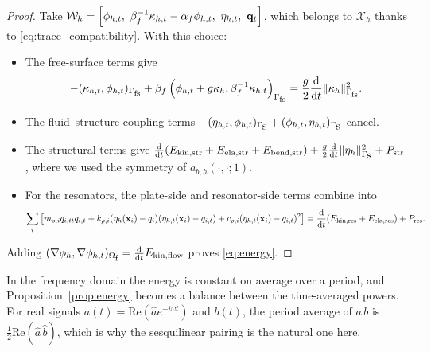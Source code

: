 \begin{proof}
Take $\mathcal{W}_h=\left[\phi_{h,t},\ \beta_f^{-1}\kappa_{h,t}-\alpha_f\phi_{h,t},\ \eta_{h,t},\ \qvec_t\right]$, which belongs to $\mathcal{X}_h$ thanks to \eqref{eq:trace_compatibility}. With this choice:
\begin{itemize}
    \item The free-surface terms give
    \begin{equation*}
        -(\kappa_{h,t},\phi_{h,t})_{\Gamma_{\mbox{\scriptsize fs}}}+\beta_f\left(\phi_{h,t}+g\kappa_h,\beta_f^{-1}\kappa_{h,t}\right)_{\Gamma_{\mbox{\scriptsize fs}}}=\frac{g}{2}\frac{\mathrm{d}}{\mathrm{d}t}\|\kappa_h\|^2_{\Gamma_{\mbox{\scriptsize fs}}}.
    \end{equation*}
    \item The fluid--structure coupling terms $-(\eta_{h,t},\phi_{h,t})_{\Gamma_{\mbox{s}}}+(\phi_{h,t},\eta_{h,t})_{\Gamma_{\mbox{s}}}$ cancel.
    \item The structural terms give $\frac{\mathrm{d}}{\mathrm{d}t}(E_{\mbox{\scriptsize kin,str}}+E_{\mbox{\scriptsize ela,str}}+E_{\mbox{\scriptsize bend,str}})+\frac{g}{2}\frac{\mathrm{d}}{\mathrm{d}t}\|\eta_h\|^2_{\Gamma_{\mbox{s}}}+P_{\mbox{\scriptsize str}}$, where we used the symmetry of $a_{b,h}(\cdot,\cdot;1)$.
    \item For the resonators, the plate-side and resonator-side terms combine into
    \begin{equation*}
        \sum_i\left[m_{\rho,i}q_{i,tt}q_{i,t}+k_{\rho,i}(\eta_h(\mathbf{x}_i)-q_i)(\eta_{h,t}(\mathbf{x}_i)-q_{i,t})+c_{\rho,i}(\eta_{h,t}(\mathbf{x}_i)-q_{i,t})^2\right]=\frac{\mathrm{d}}{\mathrm{d}t}(E_{\mbox{\scriptsize kin,res}}+E_{\mbox{\scriptsize ela,res}})+P_{\mbox{\scriptsize res}}.
    \end{equation*}
\end{itemize}
Adding $(\nabla\phi_h,\nabla\phi_{h,t})_{\Omega_{\mbox{\scriptsize f}}}=\frac{\mathrm{d}}{\mathrm{d}t}E_{\mbox{\scriptsize kin,flow}}$ proves \eqref{eq:energy}.
\end{proof}

In the frequency domain the energy is constant on average over a period, and Proposition~\ref{prop:energy} becomes a balance between the time-averaged powers. For real signals $a(t)=\mathrm{Re}(\hat a e^{-i\omega t})$ and $b(t)$, the period average of $a\,b$ is $\tfrac12\mathrm{Re}(\hat a\,\overline{\hat b})$, which is why the sesquilinear pairing is the natural one here.

